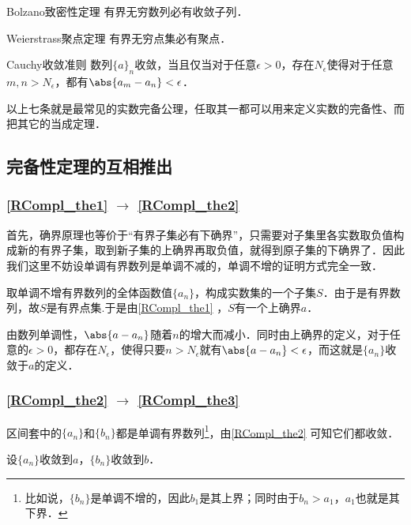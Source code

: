 \begin{theorem}{Bolzano致密性定理}\label{RCompl_the5}
有界无穷数列必有收敛子列．
\end{theorem}

\begin{theorem}{Weierstrass聚点定理}\label{RCompl_the6}
有界无穷点集必有聚点．
\end{theorem}

\begin{theorem}{Cauchy收敛准则}\label{RCompl_the7}
数列$\{a\}_n$收敛，当且仅当对于任意$\epsilon>0$，存在$N_\epsilon$使得对于任意$m, n>N_\epsilon$，都有$\abs{a_m-a_n}<\epsilon$．
\end{theorem}

以上七条就是最常见的实数完备公理，任取其一都可以用来定义实数的完备性、而把其它的当成定理．

\subsection{完备性定理的互相推出}

\subsubsection{\autoref{RCompl_the1} $\to$ \autoref{RCompl_the2} }

首先，确界原理也等价于“有界子集必有下确界”，只需要对子集里各实数取负值构成新的有界子集，取到新子集的上确界再取负值，就得到原子集的下确界了．因此我们这里不妨设单调有界数列是单调不减的，单调不增的证明方式完全一致．

取单调不增有界数列的全体函数值$\{a_n\}$，构成实数集的一个子集$S$．由于是有界数列，故$S$是有界点集.于是由\autoref{RCompl_the1} ，$S$有一个上确界$a$．

由数列单调性，$\abs{a-a_n}$随着$n$的增大而减小．同时由上确界的定义，对于任意的$\epsilon>0$，都存在$N_\epsilon$，使得只要$n>N_\epsilon$就有$\abs{a-a_n}<\epsilon$，而这就是$\{a_n\}$收敛于$a$的定义．

\subsubsection{\autoref{RCompl_the2} $\to$ \autoref{RCompl_the3} }

区间套中的$\{a_n\}$和$\{b_n\}$都是单调有界数列\footnote{比如说，$\{b_n\}$是单调不增的，因此$b_1$是其上界；同时由于$b_n>a_1$，$a_1$也就是其下界．}，由\autoref{RCompl_the2} 可知它们都收敛．

设$\{a_n\}$收敛到$a$，$\{b_n\}$收敛到$b$．

